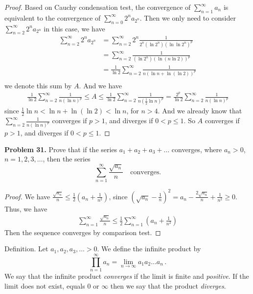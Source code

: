 \documentclass[12pt,leqno]{amsart}
\begin{document}
\begin{proof}
Based on Cauchy condensation test, the convergence of $\sum_{n=1}^\infty a_n$ is equivalent to the convergence of $\sum_{n=0}^\infty 2^n a_{2^n}$. Then we only need to consider $\sum_{n=2}^\infty 2^n a_{2^n}$ in this case, we have
\begin{align*}
    \sum_{n=2}^\infty 2^n a_{2^n} & = \sum_{n=2}^\infty 2^n \frac{1}{2^n (\ln 2^n)(\ln \ln 2^n)^p} \\
    & = \sum_{n=2}^\infty \frac{1}{(\ln 2^n)(\ln (n \ln 2))^p} \\
    & = \frac{1}{\ln 2} \sum_{n=2}^\infty \frac{1}{n(\ln n + \ln (\ln 2))^p} \\
\end{align*}
we denote this sum by $A$. And we have
\begin{align*}
   \frac{1}{\ln 2} \sum_{n=2}^\infty \frac{1}{n(\ln n)^p} \leq  A \leq \frac{1}{\ln 2} \sum_{n=2}^\infty \frac{1}{n(\frac{1}{2}\ln n)^p} = \frac{2^p}{\ln 2} \sum_{n=2}^\infty \frac{1}{n(\ln n)^p}
\end{align*}
since $\frac{1}{2}\ln n < \ln n + \ln (\ln 2) < \ln n$, for $n > 4$. And we already know that $\sum_{n=2}^\infty \frac{1}{n(\ln n)^p}$ converges if $p>1$, and diverges if $0 < p \leq 1$. So $A$ converges if $p>1$, and diverges if $0 < p \leq 1$. 
\end{proof}

\medskip


\noindent
{\bf Problem 31.}
Prove that if the series $a_1+a_2+a_3+\ldots$ converges, where $a_n>0$,
$n=1,2,3,\ldots$, then the series
$$
\sum_{n=1}^\infty \frac{\sqrt{a_n}}{n}
\quad
\mbox{converges.}
$$

\begin{proof}
We have $\frac{\sqrt{a_n}}{n}\leq \frac{1}{2}\left(a_n+\frac{1}{n^2}\right)$, since $\left(\sqrt{a_n}-\frac{1}{n}\right)^2=a_n-\frac{2\sqrt{a_n}}{n}+\frac{1}{n^2}\geq 0$. Thus, we have 
\begin{align*}
    \sum_{n=1}^\infty \frac{\sqrt{a_n}}{n} \leq \frac{1}{2}\sum_{n=1}^\infty \left(a_n + \frac{1}{n^2}\right)
\end{align*}
Then the sequence converges by comparison test.
\end{proof}

\medskip

\noindent
{\sc Definition.} Let
$a_1, a_2, a_3,\ldots>0$.
We define the infinite product by
$$
\prod_{n=1}^\infty a_n = \lim_{n\to\infty} a_1 a_2\ldots a_n\, .
$$
We say that the infinite product {\em converges} if the limit is finite and
{\em positive}. If the limit does not exist, equals $0$ or $\infty$ then
we say that the product {\em diverges}.
\end{document}
